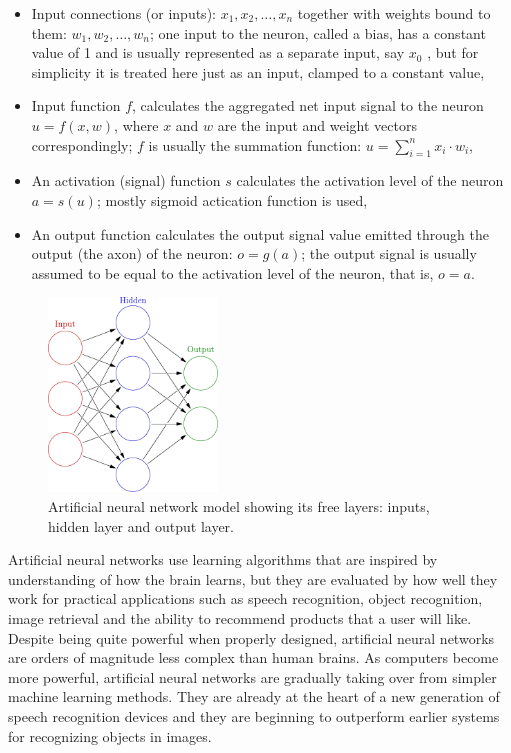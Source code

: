 \begin{itemize}
\item Input connections (or inputs): $x_1, x_2, \dots, x_n$ together with weights bound to them: $w_1, w_2, \dots, w_n$; one input to the neuron, called a bias, has a constant value of 1 and is usually represented as a separate input, say $x_0$ , but for simplicity it is treated here just as an input, clamped to a constant value,
\item Input function $f$, calculates the aggregated net input signal to the neuron $u = f(x, w)$, where $x$ and $w$ are the input and weight vectors correspondingly; $f$ is usually the summation function: $u = \sum_{i=1}^n x_i \cdot w_i$,
\item An activation (signal) function $s$ calculates the activation level of the neuron $a = s(u)$; mostly sigmoid actication function is used,
\item An output function calculates the output signal value emitted through the output (the axon) of the neuron: $o = g(a)$; the output signal is usually assumed to be equal to the activation level of the neuron, that is, $o = a$.
\end{itemize}

\clearpage
\begin{figure}
	\vspace*{-1em}
	\hspace*{1em}
	\includegraphics[width=0.4\textwidth]{images/ann_wiki_model.pdf}
	\caption{Artificial neural network model showing its free layers: inputs, hidden layer and output layer.~\cite{wiki_ann}}
	\label{fig:ann_model}
	\vspace*{-1em}
\end{figure}

Artificial neural networks use learning algorithms that are inspired by understanding of how the brain learns, but they are evaluated by how well they work for practical applications such as speech recognition, object recognition, image retrieval and the ability to recommend products that a user will like.
Despite being quite powerful when properly designed, artificial neural networks are orders of magnitude less complex than human brains.
As computers become more powerful, artificial neural networks are gradually taking over from simpler machine learning methods.
They are already at the heart of a new generation of speech recognition devices and they are beginning to outperform earlier systems for recognizing objects in images.

\vspace*{5em}

